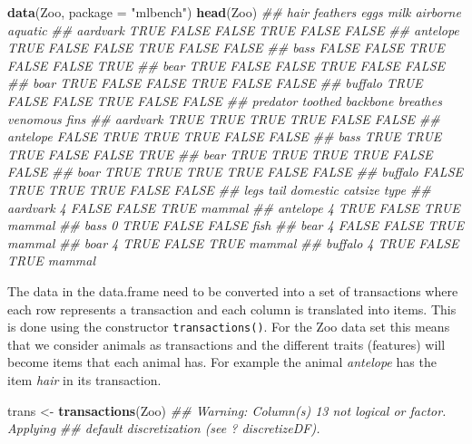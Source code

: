 \documentclass[
  notitlepage]{book}
\newenvironment{Shaded}{\begin{snugshade}}{\end{snugshade}}
\newcommand{\CommentTok}[1]{\textcolor[rgb]{0.56,0.35,0.01}{\textit{#1}}}
\newcommand{\DataTypeTok}[1]{\textcolor[rgb]{0.13,0.29,0.53}{#1}}
\newcommand{\KeywordTok}[1]{\textcolor[rgb]{0.13,0.29,0.53}{\textbf{#1}}}
\newcommand{\NormalTok}[1]{#1}
\newcommand{\StringTok}[1]{\textcolor[rgb]{0.31,0.60,0.02}{#1}}
\begin{document}
\begin{Shaded}
\begin{Highlighting}[]
\KeywordTok{data}\NormalTok{(Zoo, }\DataTypeTok{package =} \StringTok{"mlbench"}\NormalTok{)}
\KeywordTok{head}\NormalTok{(Zoo)}
\CommentTok{\#\#           hair feathers  eggs  milk airborne aquatic}
\CommentTok{\#\# aardvark  TRUE    FALSE FALSE  TRUE    FALSE   FALSE}
\CommentTok{\#\# antelope  TRUE    FALSE FALSE  TRUE    FALSE   FALSE}
\CommentTok{\#\# bass     FALSE    FALSE  TRUE FALSE    FALSE    TRUE}
\CommentTok{\#\# bear      TRUE    FALSE FALSE  TRUE    FALSE   FALSE}
\CommentTok{\#\# boar      TRUE    FALSE FALSE  TRUE    FALSE   FALSE}
\CommentTok{\#\# buffalo   TRUE    FALSE FALSE  TRUE    FALSE   FALSE}
\CommentTok{\#\#          predator toothed backbone breathes venomous  fins}
\CommentTok{\#\# aardvark     TRUE    TRUE     TRUE     TRUE    FALSE FALSE}
\CommentTok{\#\# antelope    FALSE    TRUE     TRUE     TRUE    FALSE FALSE}
\CommentTok{\#\# bass         TRUE    TRUE     TRUE    FALSE    FALSE  TRUE}
\CommentTok{\#\# bear         TRUE    TRUE     TRUE     TRUE    FALSE FALSE}
\CommentTok{\#\# boar         TRUE    TRUE     TRUE     TRUE    FALSE FALSE}
\CommentTok{\#\# buffalo     FALSE    TRUE     TRUE     TRUE    FALSE FALSE}
\CommentTok{\#\#          legs  tail domestic catsize   type}
\CommentTok{\#\# aardvark    4 FALSE    FALSE    TRUE mammal}
\CommentTok{\#\# antelope    4  TRUE    FALSE    TRUE mammal}
\CommentTok{\#\# bass        0  TRUE    FALSE   FALSE   fish}
\CommentTok{\#\# bear        4 FALSE    FALSE    TRUE mammal}
\CommentTok{\#\# boar        4  TRUE    FALSE    TRUE mammal}
\CommentTok{\#\# buffalo     4  TRUE    FALSE    TRUE mammal}
\end{Highlighting}
\end{Shaded}

The data in the data.frame need to be converted into a set of
transactions where each row represents a transaction and each column is
translated into items. This is done using the constructor
\texttt{transactions()}. For the Zoo data set this means that we consider
animals as transactions and the different traits (features) will become
items that each animal has. For example the animal \emph{antelope} has the
item \emph{hair} in its transaction.

\begin{Shaded}
\begin{Highlighting}[]
\NormalTok{trans \textless{}{-}}\StringTok{ }\KeywordTok{transactions}\NormalTok{(Zoo)}
\CommentTok{\#\# Warning: Column(s) 13 not logical or factor. Applying}
\CommentTok{\#\# default discretization (see \textquotesingle{}? discretizeDF\textquotesingle{}).}
\end{Highlighting}
\end{Shaded}
\end{document}
